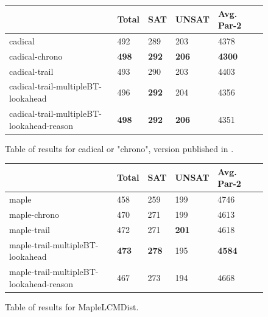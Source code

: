 \documentclass[runningheads]{llncs}
\begin{document}
\begin{figure}
\centering
    \begin{tabular}{|l|l|l|l|l|l|}
      \hline
      & Total & SAT & UNSAT & Avg. Par-2 \\ \hline
      cadical                  & 492          & 289 &  203  & 4378                            \\ \hline
      cadical-chrono   & \textbf{498}  & \textbf{292} &  \textbf{206}  & \textbf{4300}      \\ \hline
      cadical-trail           & 493          & 290 &  203  & 4403                            \\ \hline
      cadical-trail-multipleBT-lookahead & 496  & \textbf{292} &  204  & 4356                    \\ \hline
      cadical-trail-multipleBT-lookahead-reason & \textbf{498} & \textbf{292} & \textbf{206} & 4351 \\ \hline
    \end{tabular}
    \caption{Table of results for cadical or "chrono", version published in \cite{DBLP:conf/sat/MohleB19}.}
    \label{fig:cadicalOld}
\end{figure}

\begin{figure}
\centering
    \begin{tabular}{|l|l|l|l|l|l|}
      \hline
      & Total & SAT & UNSAT & Avg. Par-2 \\ \hline
      maple           & 458          & 259 &  199  & 4746                             \\ \hline
      maple-chrono   & 470          & 271 &  199  & 4613                             \\ \hline
      maple-trail    & 472          & 271 &  \textbf{201}  & 4618                \\ \hline
      maple-trail-multipleBT-lookahead & \textbf{473} & \textbf{278} &  195  & \textbf{4584} \\ \hline
      maple-trail-multipleBT-lookahead-reason & 467 & 273 & 194 & 4668 \\ \hline
    \end{tabular}
    \caption{Table of results for MapleLCMDist.}
    \label{fig:maple}
\end{figure}
\end{document}
